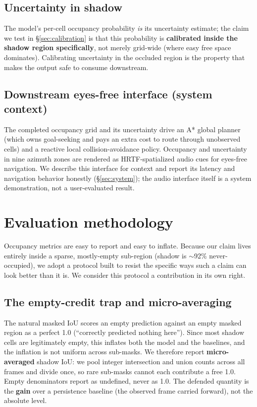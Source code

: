\documentclass{article}
\begin{document}
\subsection{Uncertainty in shadow}
\label{sec:uncertainty}

The model's per-cell occupancy probability \emph{is} its uncertainty estimate; the claim we test in
\S\ref{sec:calibration} is that this probability is \textbf{calibrated inside the shadow region specifically}, not merely
grid-wide (where easy free space dominates). Calibrating uncertainty in the occluded region is the
property that makes the output safe to consume downstream.

\subsection{Downstream eyes-free interface (system context)}
\label{sec:interface}

The completed occupancy grid and its uncertainty drive an A* global planner (which owns
goal-seeking and pays an extra cost to route through unobserved cells) and a reactive local
collision-avoidance policy. Occupancy and uncertainty in nine azimuth zones are rendered as
HRTF-spatialized audio cues for eyes-free navigation. We describe this interface for context and
report its latency and navigation behavior honestly (\S\ref{sec:system}); the audio interface itself is a
system demonstration, not a user-evaluated result.

\section{Evaluation methodology}
\label{sec:methodology}

Occupancy metrics are easy to report and easy to inflate. Because our claim lives entirely inside
a sparse, mostly-empty sub-region (shadow is ${\sim}$92\% never-occupied), we adopt a protocol built to
resist the specific ways such a claim can look better than it is. We consider this protocol a
contribution in its own right.

\subsection{The empty-credit trap and micro-averaging}
\label{sec:microavg}

The natural masked IoU scores an empty prediction against an empty masked region as a perfect 1.0
(``correctly predicted nothing here''). Since most shadow cells are legitimately empty, this inflates
both the model and the baselines, and the inflation is not uniform across sub-masks. We therefore
report \textbf{micro-averaged} shadow IoU: we pool integer intersection and union counts across all
frames and divide once, so rare sub-masks cannot each contribute a free 1.0. Empty denominators
report as undefined, never as 1.0. The defended quantity is the \textbf{gain} over a persistence
baseline (the observed frame carried forward), not the absolute level.
\end{document}
